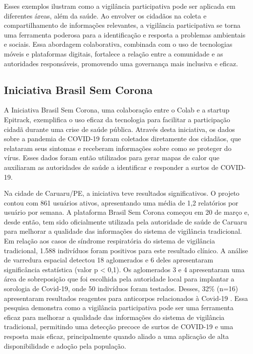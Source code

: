 Esses exemplos ilustram como a vigilância participativa pode ser aplicada em diferentes áreas, além da saúde. Ao envolver os cidadãos na coleta e compartilhamento de informações relevantes, a vigilância participativa se torna uma ferramenta poderosa para a identificação e resposta a problemas ambientais e sociais. Essa abordagem colaborativa, combinada com o uso de tecnologias móveis e plataformas digitais, fortalece a relação entre a comunidade e as autoridades responsáveis, promovendo uma governança mais inclusiva e eficaz.

\subsection*{Iniciativa Brasil Sem Corona}

A Iniciativa Brasil Sem Corona, uma colaboração entre o Colab e a startup Epitrack, exemplifica o uso eficaz da tecnologia para facilitar a participação cidadã durante uma crise de saúde pública. Através desta iniciativa, os dados sobre a pandemia de COVID-19 foram coletados diretamente dos cidadãos, que relataram seus sintomas e receberam informações sobre como se proteger do vírus. Esses dados foram então utilizados para gerar mapas de calor que auxiliaram as autoridades de saúde a identificar e responder a surtos de COVID-19.

Na cidade de Caruaru/PE, a iniciativa teve resultados significativos. O projeto contou com 861 usuários ativos, apresentando uma média de 1,2 relatórios por usuário por semana. A plataforma Brasil Sem Corona começou em 20 de março e, desde então, tem sido oficialmente utilizada pela autoridade de saúde de Caruaru para melhorar a qualidade das informações do sistema de vigilância tradicional. Em relação aos casos de síndrome respiratória do sistema de vigilância tradicional, 1.588 indivíduos foram positivos para este resultado clínico. A análise de varredura espacial detectou 18 aglomerados e 6 deles apresentaram significância estatística (valor p < 0,1). Os aglomerados 3 e 4 apresentaram uma área de sobreposição que foi escolhida pela autoridade local para implantar a sorologia de Covid-19, onde 50 indivíduos foram testados. Desses, 32\% (n=16) apresentaram resultados reagentes para anticorpos relacionados à Covid-19 \cite[1]{2020_LealNeto}. Essa pesquisa demonstra como a vigilância participativa pode ser uma ferramenta eficaz para melhorar a qualidade das informações do sistema de vigilância tradicional, permitindo uma detecção precoce de surtos de COVID-19 e uma resposta mais eficaz, principalmente quando aliado a uma aplicação de alta disponibilidade e adoção pela população.

